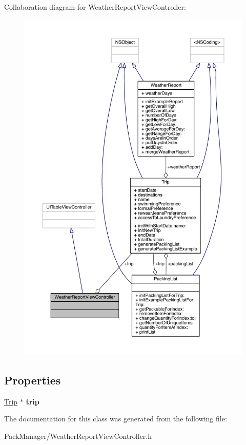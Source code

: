 Collaboration diagram for Weather\-Report\-View\-Controller\-:
\nopagebreak
\begin{figure}[H]
\begin{center}
\leavevmode
\includegraphics[width=350pt]{interface_weather_report_view_controller__coll__graph}
\end{center}
\end{figure}
\subsection*{Properties}
\begin{DoxyCompactItemize}
\item 
\hypertarget{interface_weather_report_view_controller_a0cf14329780feb3d74d5bf0da154ff21}{\hyperlink{interface_trip}{Trip} $\ast$ {\bfseries trip}}\label{interface_weather_report_view_controller_a0cf14329780feb3d74d5bf0da154ff21}

\end{DoxyCompactItemize}


The documentation for this class was generated from the following file\-:\begin{DoxyCompactItemize}
\item 
Pack\-Manager/Weather\-Report\-View\-Controller.\-h\end{DoxyCompactItemize}
